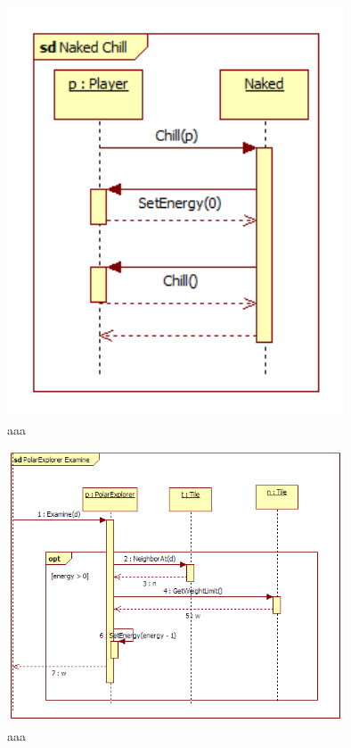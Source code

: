 \begin{figure}[H]
	\begin{center}
		\includegraphics[width=10cm]{chapters/chapter03/seqdiag/Naked_Chill.png}
		\caption{aaa}
		\label{bbb}
	\end{center}
\end{figure}
\begin{figure}[H]
	\begin{center}
		\includegraphics[width=10cm]{chapters/chapter03/seqdiag/PolarExplorer_Examine.png}
		\caption{aaa}
		\label{bbb}
	\end{center}
\end{figure}
